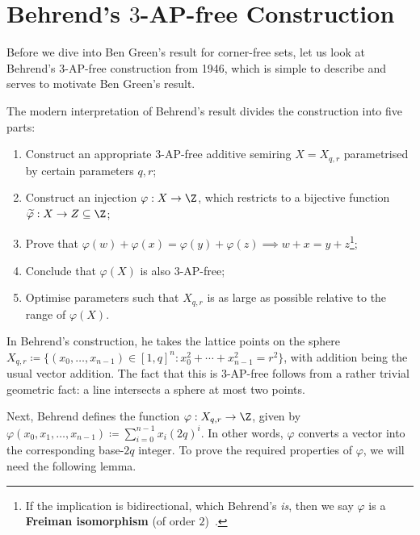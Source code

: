 \section{Behrend's \(3\)-AP-free Construction} \label{sec:behrend_3ap}

Before we dive into Ben Green's result for corner-free sets, let us look at Behrend's \(3\)-AP-free construction from 1946, which is simple to describe and serves to motivate Ben Green's result.

The modern interpretation of Behrend's result divides the construction into five parts:

\begin{enumerate}
  \item Construct an appropriate \(3\)-AP-free additive semiring \(X = X_{q, r}\) parametrised by certain parameters \(q, r\);
  \item Construct an injection \(\varphi : X \to \Z\), which restricts to a bijective function \(\widetilde{\varphi} : X \to Z \subseteq \Z\);
  \item Prove that \(\varphi(w) + \varphi(x) = \varphi(y) + \varphi(z) \implies w + x = y + z\)\footnote{If the implication is bidirectional, which Behrend's \textit{is}, then we say \(\varphi\) is a \textbf{Freiman isomorphism} (of order \(2\))~\cite{NathansonRuzsa1999}.};
  \item Conclude that \(\varphi(X)\) is also \(3\)-AP-free;
  \item Optimise parameters such that \(X_{q, r}\) is as large as possible relative to the range of \(\varphi(X)\).
\end{enumerate}

In Behrend's construction, he takes the lattice points on the sphere \(X_{q, r} \coloneqq \{(x_0, \ldots, x_{n - 1}) \in [1, q]^n : x_0^2 + \cdots + x_{n - 1}^2 = r^2\}\), with addition being the usual vector addition. The fact that this is \(3\)-AP-free follows from a rather trivial geometric fact: a line intersects a sphere at most two points.

Next, Behrend defines the function \(\varphi : X_{q, r} \to \Z\), given by \(\varphi(x_0, x_1, \ldots, x_{n - 1}) \coloneqq \sum_{i = 0}^{n - 1} x_i(2q)^i\). In other words, \(\varphi\) converts a vector into the corresponding base-\(2q\) integer. To prove the required properties of \(\varphi\), we will need the following lemma.

